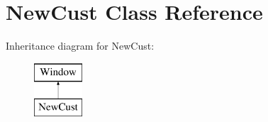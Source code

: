 \hypertarget{classnewcust_1_1_new_cust}{}\section{New\+Cust Class Reference}
\label{classnewcust_1_1_new_cust}
Inheritance diagram for New\+Cust\+:\begin{figure}[H]
\begin{center}
\leavevmode
\includegraphics[height=2.000000cm]{classnewcust_1_1_new_cust}
\end{center}
\end{figure}

